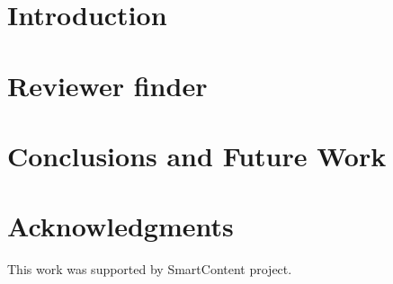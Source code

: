 \documentclass{llncs}
\begin{document}
\section{Introduction}\label{sec:Introduction}


%



\section{Reviewer finder}\label{sec:Motivation}





%


\section{Conclusions and Future Work}\label{sec:Conclusions}





\section*{Acknowledgments}

This work was supported by SmartContent project.



%






\clearpage
{} %
\renewcommand{\indexname}{Author Index}
\printindex \clearpage
{} %
\renewcommand{\indexname}{Subject Index}
 
\end{document}
